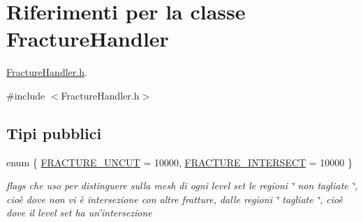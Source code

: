 \hypertarget{classFractureHandler}{\section{Riferimenti per la classe Fracture\-Handler}
\label{classFractureHandler}
}


\hyperlink{FractureHandler_8h}{Fracture\-Handler.\-h}.  




{\ttfamily \#include $<$Fracture\-Handler.\-h$>$}

\subsection*{Tipi pubblici}
\begin{DoxyCompactItemize}
\item 
enum \{ \hyperlink{classFractureHandler_a495ad4fc72d0c47c8f0424842f1153aaaa992cc3ad024a030ecd798dc319c95ac}{F\-R\-A\-C\-T\-U\-R\-E\-\_\-\-U\-N\-C\-U\-T} = 10000, 
\hyperlink{classFractureHandler_a495ad4fc72d0c47c8f0424842f1153aaa781cae3f3b99bf9357fed2833d315537}{F\-R\-A\-C\-T\-U\-R\-E\-\_\-\-I\-N\-T\-E\-R\-S\-E\-C\-T} = 10000
 \}
\begin{DoxyCompactList}\small\item\em flags che uso per distinguere sulla mesh di ogni level set le regioni \char`\"{} non tagliate \char`\"{}, cioè dove non vi è intersezione con altre fratture, dalle regioni \char`\"{} tagliate \char`\"{}, cioè dove il level set ha un'intersezione \end{DoxyCompactList}\end{DoxyCompactItemize}
